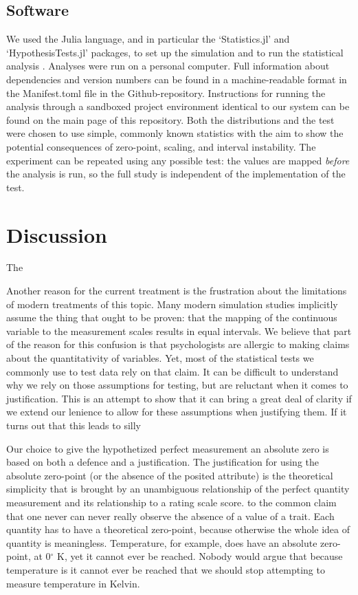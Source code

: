 \documentclass[utf8]{FrontiersinVancouver}
\begin{document}
\subsection{Software}
We used the Julia language, and in particular the `Statistics.jl' and `HypothesisTests.jl' packages, to set up the simulation and to run the statistical analysis \citep{bezanson2017julia}. Analyses were run on a personal computer. Full information about dependencies and version numbers can be found in a machine-readable format in the Manifest.toml file in the Github-repository. Instructions for running the analysis through a sandboxed project environment identical to our system can be found on the main page of this repository. Both the distributions and the test were chosen to use simple, commonly known statistics with the aim to show the potential consequences of zero-point, scaling, and interval instability. The experiment can be repeated using any possible test: the values are mapped \textit{before} the analysis is run, so the full study is independent of the implementation of the test.



\section{Discussion}
The 

Another reason for the current treatment is the frustration about the limitations of modern treatments of this topic. Many modern simulation studies implicitly assume the thing that ought to be proven: that the mapping of the continuous variable to the measurement scales results in equal intervals. We believe that part of the reason for this confusion is that psychologists are allergic to making claims about the quantitativity of variables. Yet, most of the statistical tests we commonly use to test data rely on that claim. It can be difficult to understand why we rely on those assumptions for testing, but are reluctant when it comes to justification. This is an attempt to show that it can bring a great deal of clarity if we extend our lenience to allow for these assumptions when justifying them. If it turns out that this leads to silly

Our choice to give the hypothetized perfect measurement an absolute zero is based on both a defence and a justification. The justification for using the absolute zero-point (or the absence of the posited attribute) is the theoretical simplicity that is brought by an unambiguous relationship of the perfect quantity measurement and its relationship to a rating scale score.  to the common claim that one never can never really observe the absence of a value of a trait. Each quantity has to have a theoretical zero-point, because otherwise the whole idea of quantity is meaningless. Temperature, for example, does have an absolute zero-point, at 0$^\circ$ K, yet it cannot ever be reached. Nobody would argue that because temperature is  it cannot ever be reached that we should stop attempting to measure temperature in Kelvin. 
\end{document}
